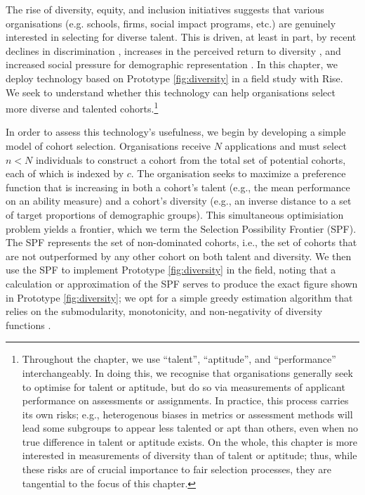 The rise of diversity, equity, and inclusion initiatives suggests that various organisations (e.g. schools, firms, social impact programs, etc.) are genuinely interested in selecting for diverse talent. This is driven, at least in part, by recent declines in discrimination \cite{hsieh2019allocation}, increases in the perceived return to diversity \cite{deming2017growing, page_diversity_2017, noray2023systemic}, and increased social pressure for demographic representation \cite{minkin2023diversity}. In this chapter, we deploy technology based on Prototype \ref{fig:diversity} in a field study with Rise. We seek to understand whether this technology can help organisations select more diverse and talented cohorts.\footnote{Throughout the chapter, we use ``talent'', ``aptitude'', and ``performance'' interchangeably. In doing this, we recognise that organisations generally seek to optimise for talent or aptitude, but do so via measurements of applicant performance on assessments or assignments. In practice, this process carries its own risks; e.g., heterogenous biases in metrics or assessment methods will lead some subgroups to appear less talented or apt than others, even when no true difference in talent or aptitude exists. On the whole, this chapter is more interested in measurements of diversity than of talent or aptitude; thus, while these risks are of crucial importance to fair selection processes, they are tangential to the focus of this chapter.}

In order to assess this technology's usefulness, we begin by developing a simple model of cohort selection. Organisations receive $N$ applications and must select $n<N$ individuals to construct a cohort from the total set of potential cohorts, each of which is indexed by $c$. The organisation seeks to maximize a preference function that is increasing in both a cohort's talent (e.g., the mean performance on an ability measure) and a cohort's diversity (e.g., an inverse distance to a set of target proportions of demographic groups). This simultaneous optimisiation problem yields a frontier, which we term the Selection Possibility Frontier (SPF). The SPF represents the set of non-dominated cohorts, i.e., the set of cohorts that are not outperformed by any other cohort on both talent and diversity. We then use the SPF to implement Prototype \ref{fig:diversity} in the field, noting that a calculation or approximation of the SPF serves to produce the exact figure shown in Prototype \ref{fig:diversity}; we opt for a simple greedy estimation algorithm that relies on the submodularity, monotonicity, and non-negativity of diversity functions \cite{krause2014submodular, huppenkothen2020entrofy}.

